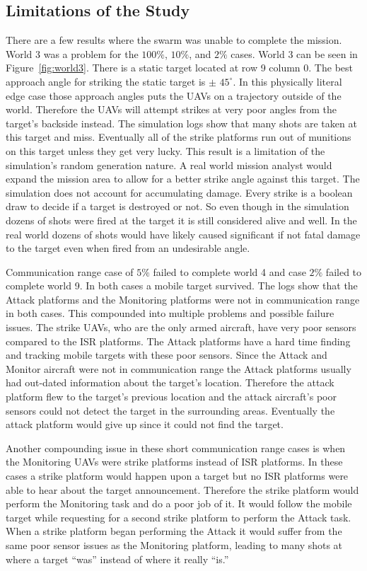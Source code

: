\begin{multicols*}{2}
\section{Limitations of the Study}
There are a few results where the swarm was unable to complete the mission.  World 3 was a problem for the $100\%$, $10\%$, and $2\%$ cases.  World 3 can be seen in Figure~\ref{fig:world3}.  There is a static target located at row 9 column 0.  The best approach angle for striking the static target is $\pm$ $45^{\circ}$.  In this physically literal edge case those approach angles puts the UAVs on a trajectory outside of the world.  Therefore the UAVs will attempt strikes at very poor angles from the target's backside instead.  The simulation logs show that many shots are taken at this target and miss.  Eventually all of the strike platforms run out of munitions on this target unless they get very lucky.  This result is a limitation of the simulation's random generation nature.  A real world mission analyst would expand the mission area to allow for a better strike angle against this target.  The simulation does not account for accumulating damage.  Every strike is a boolean draw to decide if a target is destroyed or not.  So even though in the simulation dozens of shots were fired at the target it is still considered alive and well.  In the real world dozens of shots would have likely caused significant if not fatal damage to the target even when fired from an undesirable angle.

Communication range case of $5\%$ failed to complete world 4 and case $2\%$ failed to complete world 9.  In both cases a mobile target survived.  The logs show that the Attack platforms and the Monitoring platforms were not in communication range in both cases.  This compounded into multiple problems and possible failure issues.  The strike UAVs, who are the only armed aircraft, have very poor sensors compared to the ISR platforms.  The Attack platforms have a hard time finding and tracking mobile targets with these poor sensors.  Since the Attack and Monitor aircraft were not in communication range the Attack platforms usually had out-dated information about the target's location.  Therefore the attack platform flew to the target's previous location and the attack aircraft's poor sensors could not detect the target in the surrounding areas.  Eventually the attack platform would give up since it could not find the target.

Another compounding issue in these short communication range cases is when the Monitoring UAVs were strike platforms instead of ISR platforms.  In these cases a strike platform would happen upon a target but no ISR platforms were able to hear about the target announcement.  Therefore the strike platform would perform the Monitoring task and do a poor job of it.  It would follow the mobile target while requesting for a second strike platform to perform the Attack task.  When a strike platform began performing the Attack it would suffer from the same poor sensor issues as the Monitoring platform, leading to many shots at where a target ``was'' instead of where it really ``is.''



\end{multicols*}
